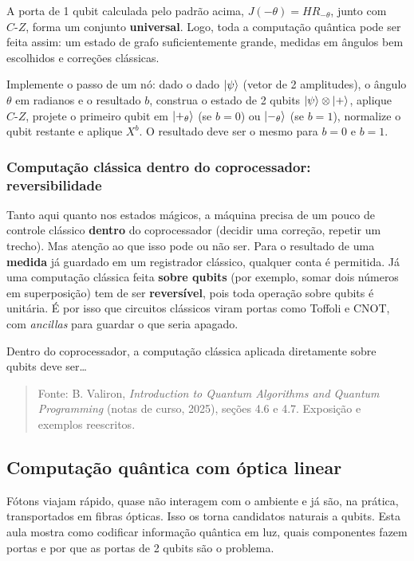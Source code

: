 A porta de 1 qubit calculada pelo padrão acima, \(J(-\theta)=H R_{-\theta}\), junto com \(C\text{-}Z\), forma um conjunto \textbf{universal}. Logo, toda a computação quântica pode ser feita assim: um estado de grafo suficientemente grande, medidas em ângulos bem escolhidos e correções clássicas.

Implemente o passo de um nó: dado o dado \(\left|{\psi}\right>\) (vetor de 2 amplitudes), o ângulo \(\theta\) em radianos e o resultado \(b\), construa o estado de 2 qubits \(\left|{\psi}\right>\otimes\left|{+}\right>\), aplique \(C\text{-}Z\), projete o primeiro qubit em \(\left|{+_\theta}\right>\) (se \(b=0\)) ou \(\left|{-_\theta}\right>\) (se \(b=1\)), normalize o qubit restante e aplique \(X^b\). O resultado deve ser o mesmo para \(b=0\) e \(b=1\).

\subsubsection{Computação clássica dentro do coprocessador: reversibilidade}\label{computauxe7uxe3o-cluxe1ssica-dentro-do-coprocessador-reversibilidade}

Tanto aqui quanto nos estados mágicos, a máquina precisa de um pouco de controle clássico \textbf{dentro} do coprocessador (decidir uma correção, repetir um trecho). Mas atenção ao que isso pode ou não ser. Para o resultado de uma \textbf{medida} já guardado em um registrador clássico, qualquer conta é permitida. Já uma computação clássica feita \textbf{sobre qubits} (por exemplo, somar dois números em superposição) tem de ser \textbf{reversível}, pois toda operação sobre qubits é unitária. É por isso que circuitos clássicos viram portas como Toffoli e CNOT, com \emph{ancillas} para guardar o que seria apagado.

Dentro do coprocessador, a computação clássica aplicada diretamente sobre qubits deve ser\ldots{}

\begin{quote}
Fonte: B. Valiron, \emph{Introduction to Quantum Algorithms and Quantum Programming} (notas de curso, 2025), seções 4.6 e 4.7. Exposição e exemplos reescritos.
\end{quote}

\subsection{Computação quântica com óptica linear}
Fótons viajam rápido, quase não interagem com o ambiente e já são, na prática, transportados em fibras ópticas. Isso os torna candidatos naturais a qubits. Esta aula mostra como codificar informação quântica em luz, quais componentes fazem portas e por que as portas de 2 qubits são o problema.

